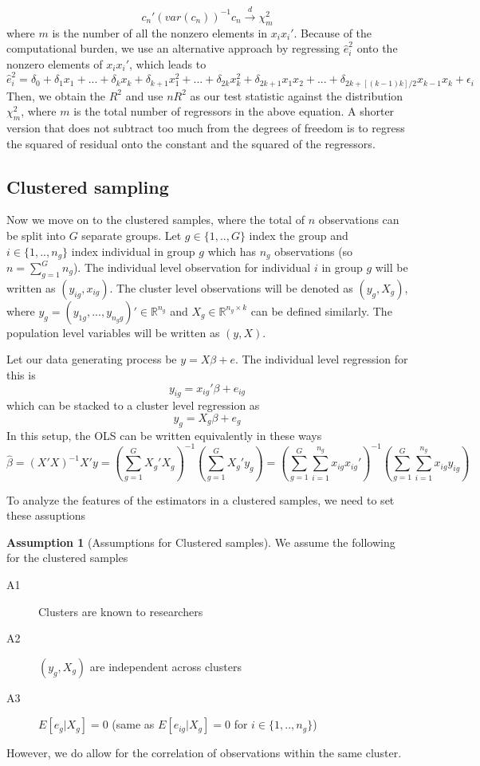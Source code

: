 \documentclass[12pt]{article}
\theoremstyle{definition}
\theoremstyle{property}
\theoremstyle{assumption}
\newtheorem{assumption}{Assumption}[section]
\theoremstyle{example}
\theoremstyle{comment}
\begin{document}
\[
c_n'(var(c_n))^{-1}c_n\xrightarrow{d}\chi^2_m
\]
where $m$ is the number of all the nonzero elements in $x_ix_i'$. Because of the computational burden, we use an alternative approach by regressing $\hat{e}_i^2$ onto the nonzero elements of $x_ix_i'$, which leads to
\[
\hat{e}_i^2 = \delta_0+\delta_1 x_1 + ... + \delta_k x_k + \delta_{k+1} x_1^2 + ... + \delta_{2k}x_k^2 + \delta_{2k+1}x_1x_2+...+\delta_{2k+[(k-1)k]/2}x_{k-1}x_k+\epsilon_i
\]
Then, we obtain the $R^2$ and use $nR^2$ as our test statistic against the distribution $\chi^2_{m}$, where $m$ is the total number of regressors in the above equation. A shorter version that does not subtract too much from the degrees of freedom is to regress the squared of residual onto the constant and the squared of the regressors. 
\subsection{Clustered sampling}
Now we move on to the clustered samples, where the total of $n$ observations can be split into $G$ separate groups. Let $g\in\{1,..,G\}$ index the group and $i\in\{1,..,n_g\}$ index individual in group $g$ which has $n_g$ observations (so $n=\sum_{g=1}^G n_g$).  The individual level observation for individual $i$ in group $g$ will be written as $(y_{ig}, x_{ig})$. The cluster level observations will be denoted as $(y_{g}, X_{g})$, where $y_g = (y_{1g},...,y_{n_{g}g})'\in\mathbb{R}^{n_g}$ and $X_g\in\mathbb{R}^{n_g\times k}$ can be defined similarly. The population level variables will be written as $(y,X)$.
\par
Let our data generating process be $y=X\beta+e$. The individual level regression for this is
\[
y_{ig} = x_{ig}'\beta+e_{ig}
\]
which can be stacked to a cluster level regression as
\[
y_{g} = X_{g}\beta+e_{g}
\]
In this setup, the OLS can be written equivalently in these ways
\[
\hat{\beta}=(X'X)^{-1}X'y=\left(\sum_{g=1}^G X_g'X_g\right)^{-1}\left(\sum_{g=1}^G X_g'y_g\right)=\left(\sum_{g=1}^G\sum_{i=1}^{n_g} x_{ig}x_{ig}'\right)^{-1}\left(\sum_{g=1}^G\sum_{i=1}^{n_g}x_{ig}y_{ig}\right)
\]
\par
To analyze the features of the estimators in a clustered samples, we need to set these assuptions
\begin{mdframed}[backgroundcolor=blue!5] 
\begin{assumption}[Assumptions for Clustered samples]
We assume the following for the clustered samples
\begin{description}
\item[A1] Clusters are known to researchers
\item[A2] $(y_g, X_g)$ are independent across clusters
\item[A3] $E[e_g|X_g]=0$ (same as $E[e_{ig}|X_g]=0$ for $i\in\{1,..,n_g\}$)
\end{description}
However, we do allow for the correlation of observations within the same cluster. 
\end{assumption}
\end{mdframed}
\end{document}
